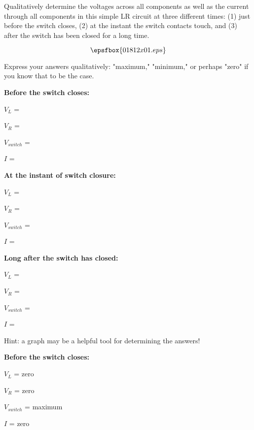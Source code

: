 

Qualitatively determine the voltages across all components as well as the current through all components in this simple LR circuit at three different times: (1) just before the switch closes, (2) at the instant the switch contacts touch, and (3) after the switch has been closed for a long time.

$$\epsfbox{01812x01.eps}$$

Express your answers qualitatively: "maximum," "minimum," or perhaps "zero" if you know that to be the case.

\vskip 10pt
\goodbreak

\noindent
{\bf Before the switch closes:}

$V_{L}$ = 

$V_{R}$ = 

$V_{switch}$ = 

$I$ = 

\vskip 10pt
\goodbreak

\noindent
{\bf At the instant of switch closure:}

$V_{L}$ = 

$V_{R}$ = 

$V_{switch}$ = 

$I$ = 

\vskip 10pt
\goodbreak

\noindent
{\bf Long after the switch has closed:}

$V_{L}$ = 

$V_{R}$ = 

$V_{switch}$ = 

$I$ = 

\vskip 10pt

Hint: a graph may be a helpful tool for determining the answers!







\noindent
{\bf Before the switch closes:}

$V_{L}$ = zero

$V_{R}$ = zero

$V_{switch}$ = maximum

$I$ = zero

\vskip 10pt
\goodbreak

